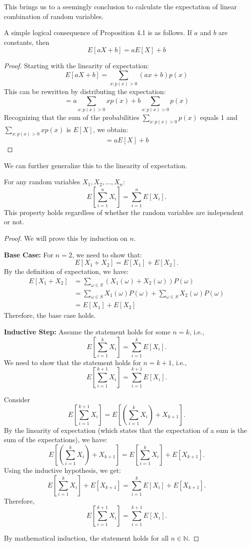 This brings us to a seemingly conclusion to calculate the expectation of linear combination of random variables.
\begin{corollary}
    A simple logical consequence of Proposition 4.1 is as follows. If \(a\) and \(b\) are constants, then
\[ E[aX + b] = aE[X] + b \]
\end{corollary}
\begin{proof}
    Starting with the linearity of expectation:
\[
E[aX + b] = \sum_{x:p(x)>0} (ax + b)p(x)
\]
This can be rewritten by distributing the expectation:
\[
= a \sum_{x:p(x)>0} xp(x) + b \sum_{x:p(x)>0} p(x)
\]
Recognizing that the sum of the probabilities \( \sum_{x:p(x)>0} p(x) \) equals 1 and \( \sum_{x:p(x)>0} xp(x) \) is \( E[X] \), we obtain:
\[
= aE[X] + b
\]
\end{proof}

We can further generalize this to the linearity of expectation.
\begin{theorem}
For any random variables \(X_1, X_2, \ldots, X_n\):
\[
E\left[\sum_{i=1}^n X_i\right] = \sum_{i=1}^n E[X_i].
\]
This property holds regardless of whether the random variables are independent or not.
\end{theorem}
\begin{proof}
    We will prove this by induction on $n$.

    \textbf{Base Case:} For $n = 2$, we need to show that:
    \[
    E[X_1 + X_2] = E[X_1] + E[X_2].
    \]
    By the definition of expectation, we have:
    \begin{align*}
    E[X_1 + X_2] &= \sum_{\omega \in S} (X_1(\omega) + X_2(\omega)) P(\omega) \\
                 &= \sum_{\omega \in S} X_1(\omega) P(\omega) + \sum_{\omega \in S} X_2(\omega) P(\omega) \\
                 &= E[X_1] + E[X_2]
    \end{align*}
    Therefore, the base case holds.

    \textbf{Inductive Step:} Assume the statement holds for some $n = k$, i.e.,
    \[
    E\left[ \sum_{i=1}^k X_i \right] = \sum_{i=1}^k E[X_i].
    \]
    We need to show that the statement holds for $n = k+1$, i.e.,
    \[
    E\left[ \sum_{i=1}^{k+1} X_i \right] = \sum_{i=1}^{k+1} E[X_i].
    \]

    Consider
    \[
    E\left[ \sum_{i=1}^{k+1} X_i \right] = E\left[ \left( \sum_{i=1}^k X_i \right) + X_{k+1} \right].
    \]
    By the linearity of expectation (which states that the expectation of a sum is the sum of the expectations), we have:
    \[
    E\left[ \left( \sum_{i=1}^k X_i \right) + X_{k+1} \right] = E\left[ \sum_{i=1}^k X_i \right] + E[X_{k+1}].
    \]
    Using the inductive hypothesis, we get:
    \[
    E\left[ \sum_{i=1}^k X_i \right] + E[X_{k+1}] = \sum_{i=1}^k E[X_i] + E[X_{k+1}].
    \]
    Therefore,
    \[
    E\left[ \sum_{i=1}^{k+1} X_i \right] = \sum_{i=1}^{k+1} E[X_i].
    \]

    By mathematical induction, the statement holds for all $n \in \mathbb{N}$.
\end{proof}

